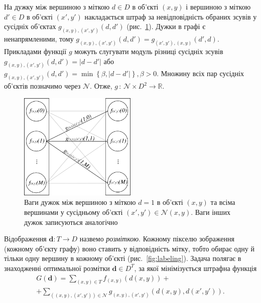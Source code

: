 На дужку між вершиною з міткою $d \in D$ в об'єкті $\left(x, y \right)$
і вершиною з міткою $d' \in D$ в об'єкті $\left(x', y' \right)$
накладається штраф за невідповідність обраних зсувів у сусідніх об'єктах
$g_{\left(x, y \right), \left(x', y' \right)} \left(d, d' \right)$
(рис.~\ref{fig:neighbor:edge:weights}).
Дужки в графі є ненапрямленими, тому
$g_{\left(x, y \right), \left(x', y' \right)} \left(d, d' \right) =
    g_{\left(x', y' \right), \left(x, y \right)} \left(d', d \right)$.
Прикладами функції $g$ можуть слугувати модуль різниці сусідніх зсувів
$g_{\left(x, y \right), \left(x', y' \right)} \left(d, d' \right) = \left| d - d' \right|$
або
$g_{\left(x, y \right), \left(x', y' \right)} \left(d, d' \right) =
    \min \left\{ \beta, \left| d - d' \right| \right\}, \beta > 0$.
Множину всіх пар сусідніх об'єктів позначимо через $\mathcal{N}$.
Отже, $g \, : \, \mathcal{N} \times D^2 \to \mathbb{R}$.

\begin{figure}[h]
  \centering
  \includegraphics[width=0.5\textwidth]{images/neighbor_edge_weights}
  \caption{Ваги дужок між вершиною з міткою $d = 1$ в об'єкті
           $\left(x, y \right)$ та всіма вершинами у сусідньому об'єкті
           $\left(x', y' \right) \in \mathcal{N}\left(x, y \right)$.
           Ваги інших дужок записуються аналогічно}
  \label{fig:neighbor:edge:weights}
\end{figure}

Відображення $\pmb{d} : T \rightarrow D$ назвемо \textit{розміткою}.
Кожному пікселю зображення (кожному об'єкту графу)
воно ставить у відповідність мітку,
тобто обирає одну й тільки одну вершину в кожному об'єкті
(рис.~\ref{fig:labeling}).
Задача полягає в знаходженні оптимальної розмітки $\pmb{d} \in D^T$,
за якої мінімізується штрафна функція
\begin{equation} \label{eq:overview:penalty}
\begin{gathered}
    G \left( \pmb{d} \right)
    = \sum \limits_{\left(x, y \right) \in T}
        f_{\left(x, y \right)} \left(d \left(x, y \right) \right) + \\
    + \sum \limits_{\left(\left(x, y \right), \left(x', y'\right) \right) \in \mathcal{N}}
        g_{\left(x, y \right), \left(x', y' \right)} \left(
            d \left( x, y \right), d \left( x', y' \right)
        \right).
\end{gathered}
\end{equation}

